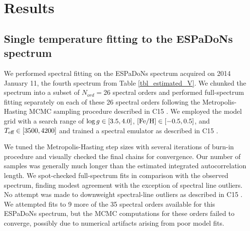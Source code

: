 \documentclass[onecolumn]{emulateapj}%
\newcommand{\iancze}{{\sc C15 }}
\begin{document}
\section{Results}

\subsection{Single temperature fitting to the ESPaDoNs spectrum}

We performed spectral fitting on the ESPaDoNs spectrum acquired on 2014 January 11, the fourth spectrum from Table \ref{tbl_estimated_V}.  We chunked the spectrum into a subset of $N_{ord}=$26 spectral orders and performed full-spectrum fitting separately on each of these 26 spectral orders following the Metropolis-Hasting MCMC sampling procedure described in \iancze.  We employed the \PHOENIX model grid with a search range of $\log g \in [3.5, 4.0]$, $[{\rm Fe}/{\rm H}] \in [-0.5, 0.5]$, and $T_\textrm{eff} \in [3500, 4200]$ and trained a spectral emulator as described in \iancze.  

We tuned the Metropolis-Hasting step sizes with several iterations of burn-in procedure and visually checked the final chains for convergence.  Our number of samples was generally much longer than the estimated integrated autocorrelation length.  We spot-checked full-spectrum fits in comparison with the observed spectrum, finding modest agreement with the exception of spectral line outliers.  No attempt was made to downweight spectral-line outliers as described in \iancze.  We attempted fits to 9 more of the 35 spectral orders available for this ESPaDoNs spectrum, but the MCMC computations for these orders failed to converge, possibly due to numerical artifacts arising from poor model fits.
\end{document}
